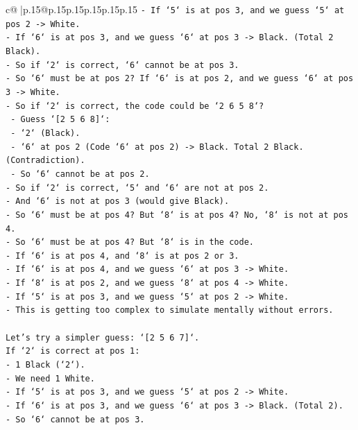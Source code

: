 \documentclass{article}
\begin{document}
{\begin{supertabular}{c@{$\;$}|p{.15\linewidth}@{}p{.15\linewidth}p{.15\linewidth}p{.15\linewidth}p{.15\linewidth}p{.15\linewidth}}
{{{\texttt{{-} If `5` is at pos 3, and we guess `5` at pos 2 {-}> White.} \\
\texttt{{-} If `6` is at pos 3, and we guess `6` at pos 3 {-}> Black. (Total 2 Black).} \\
\texttt{{-} So if `2` is correct, `6` cannot be at pos 3.} \\
\texttt{{-} So `6` must be at pos 2? If `6` is at pos 2, and we guess `6` at pos 3 {-}> White.} \\
\texttt{{-} So if `2` is correct, the code could be `2 6 5 8`?} \\
\texttt{    {-} Guess `{[}2 5 6 8{]}`:} \\
\texttt{        {-} `2` (Black).} \\
\texttt{        {-} `6` at pos 2 (Code `6` at pos 2) {-}> Black. Total 2 Black. (Contradiction).} \\
\texttt{    {-} So `6` cannot be at pos 2.} \\
\texttt{{-} So if `2` is correct, `5` and `6` are not at pos 2.} \\
\texttt{{-} And `6` is not at pos 3 (would give Black).} \\
\texttt{{-} So `6` must be at pos 4? But `8` is at pos 4? No, `8` is not at pos 4.} \\
\texttt{{-} So `6` must be at pos 4? But `8` is in the code.} \\
\texttt{{-} If `6` is at pos 4, and `8` is at pos 2 or 3.} \\
\texttt{{-} If `6` is at pos 4, and we guess `6` at pos 3 {-}> White.} \\
\texttt{{-} If `8` is at pos 2, and we guess `8` at pos 4 {-}> White.} \\
\texttt{{-} If `5` is at pos 3, and we guess `5` at pos 2 {-}> White.} \\
\texttt{{-} This is getting too complex to simulate mentally without errors.} \\
\\ 
\texttt{Let's try a simpler guess: `{[}2 5 6 7{]}`.} \\
\texttt{If `2` is correct at pos 1:} \\
\texttt{{-} 1 Black (`2`).} \\
\texttt{{-} We need 1 White.} \\
\texttt{{-} If `5` is at pos 3, and we guess `5` at pos 2 {-}> White.} \\
\texttt{{-} If `6` is at pos 3, and we guess `6` at pos 3 {-}> Black. (Total 2).} \\
\texttt{{-} So `6` cannot be at pos 3.} \\
}}}
\end{supertabular}}
\end{document}
